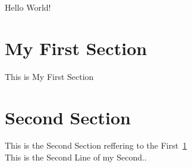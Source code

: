 \documentclass{article}
\begin{document}
    Hello World!

    \section{My First Section}
    \label{sec:mfs}

    This is My First Section

    \section{Second Section}
    \label{sec:ss}

    This is the Second Section reffering to the First~\ref{sec:mfs}\\
    This is the Second Line of my Second..
\end{document}
